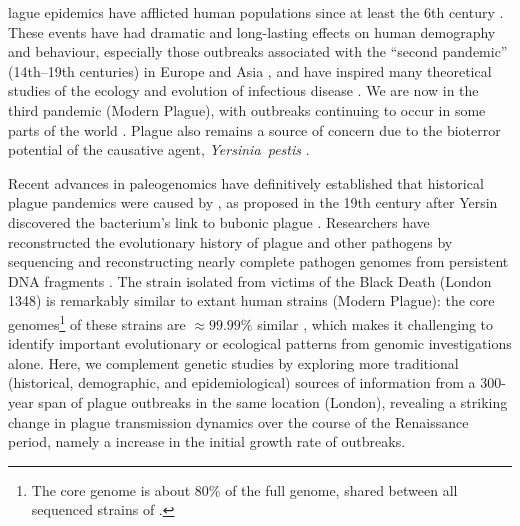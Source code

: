 \bigskip


\bigbreak

\noindent{}

\bigbreak

lague epidemics have afflicted human populations since at least the 6th century \cite{McNe76,Wagn+14}.  These events have had dramatic and long-lasting effects on human demography and behaviour, especially those outbreaks associated with the ``second pandemic'' (14th--19th centuries) in Europe and Asia \cite{Pepy1669,Lath85,Defo1722,McNe76}, and have inspired many
theoretical studies of the ecology and evolution of infectious disease \cite{KermMcKe27,AndeMay91,KeelGill00,Baca12,Silv16,LewnTown16,Yue+16,Dean+18}.
We are now in the third pandemic (Modern Plague), with outbreaks continuing to occur in some parts of the world \cite{PerrFeth97,Neer+10,WHO10,ECDC17,Robe17}. Plague also remains a source of concern due to the bioterror potential of the causative agent, \emph{Yersinia~pestis} \cite{Ligo06,CDCplagueEmergencyFAQ}. 

Recent advances in paleogenomics have definitively established that historical plague pandemics were caused by \ypestis
 \cite{Bos+11,Bene11}, as proposed in the 19th century after Yersin discovered the bacterium's link to bubonic plague \cite{Butl14}.
 Researchers have reconstructed the evolutionary history of plague and other pathogens by sequencing and reconstructing nearly complete pathogen genomes from persistent DNA fragments \cite{Schu+11, Bos+11,Deva+14}.
 The strain isolated from victims of the Black Death (London 1348) is  remarkably similar to extant human strains (Modern Plague): 
the core genomes\footnote{The core genome is about 80\% of the full genome, shared between all sequenced strains of \ypestis.} of these strains are $\approx 99.99\%$ similar \cite{Bos+11}, which makes it challenging to 
identify important evolutionary or ecological patterns
from genomic investigations alone.  Here, we complement genetic studies by exploring more traditional (historical, demographic, and epidemiological) sources of information
from a 300-year span of plague outbreaks in the same location (London), revealing a striking change in plague transmission dynamics over the course of the Renaissance period, namely a \foldval increase in the initial growth rate of outbreaks.


